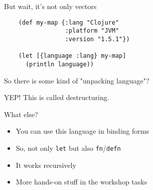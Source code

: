 \begin{frame}[fragile]
  \begin{center}
    But wait, it's not only vectors
  \end{center}
  \begin{verbatim}
    (def my-map {:lang "Clojure"
                 :platform "JVM"
                 :version "1.5.1"})

    (let [{language :lang} my-map]
      (println language))
  \end{verbatim}
\end{frame}

\begin{frame}
  \begin{center}
    So there is some kind of "unpacking language"?

    \pause
    YEP! This is called destructuring.
  \end{center}
\end{frame}

\begin{frame}
  What else?

  \begin{itemize}
    \item You can use this language in binding forms
    \item So, not only \texttt{let} but also \texttt{fn}/\texttt{defn}
    \item It works recursively
    \item More hands-on stuff in the workshop tasks
  \end{itemize}
\end{frame}


